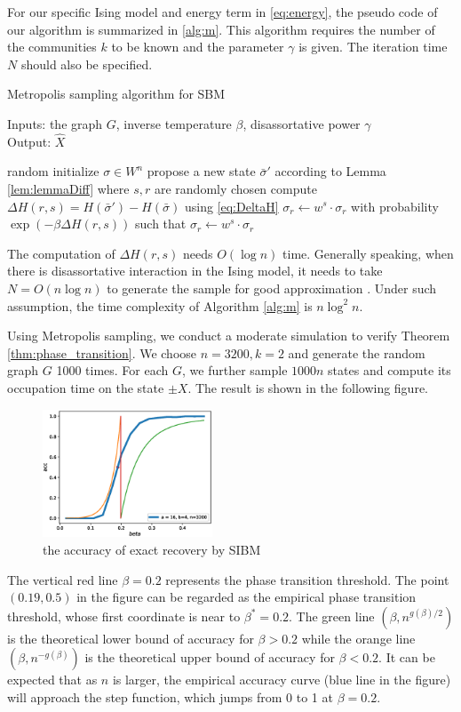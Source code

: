 \documentclass[journal]{IEEEtran}
\newcommand{\1}{\mathbbm{1}}
\begin{document}
For our specific Ising model and energy term in \eqref{eq:energy},
the pseudo code of our algorithm is summarized in \ref{alg:m}.
This algorithm requires the number of the communities $k$ to be known and the parameter $\gamma$ is given.
The iteration time $N$ should also be specified.
\begin{algorithm}[H]
	\caption{Metropolis sampling algorithm for SBM} \label{alg:m}
	Inputs: the graph $G$, inverse temperature $\beta$, disassortative power $\gamma$ \\
	Output: $\hat{X}$
	\begin{algorithmic}[1]
		\STATE random initialize $\sigma \in W^n$
		\STATE propose a new state $\bar{\sigma}'$ according to Lemma \ref{lem:lemmaDiff} where $s, r$ are randomly chosen
		\STATE compute $\Delta H(r,s) = H(\bar{\sigma}') - H(\bar{\sigma})$ using \eqref{eq:DeltaH}
		\STATE $\sigma_r \leftarrow w^s \cdot \sigma_r$
		\ELSE
		\STATE with probability $\exp(-\beta \Delta H(r,s))$
			such that $\sigma_r \leftarrow w^s \cdot \sigma_r$
		\ENDIF
		\ENDFOR
	\end{algorithmic}
\end{algorithm}
The computation of $\Delta H(r,s)$ needs $O(\log n)$ time. Generally speaking, when there is disassortative interaction in
the Ising model, it needs to take $N=O(n\log n)$ to generate the sample for good approximation \cite{mcmc}.
Under such assumption, the time complexity of Algorithm \ref{alg:m} is $n \log^2 n$.

Using Metropolis sampling, we conduct a moderate simulation to verify Theorem \ref{thm:phase_transition}.
We choose $n=3200, k=2$ and generate the random graph $G$ 1000 times. For each $G$, we further sample $1000n$ states and compute its
occupation time on the state $\pm X$. The result is shown in the following figure.
\begin{figure}[!ht]
	\includegraphics[width=0.45\textwidth]{beta_trans-2020-11-13.eps}
	\caption{the accuracy of exact recovery by SIBM}
\end{figure}
The vertical red line $\beta=0.2$ represents the phase transition threshold. The point $(0.19,0.5)$ in the figure
can be regarded as the empirical phase transition threshold, whose first coordinate is near to $\beta^* = 0.2$.
The green line $(\beta, n^{g(\beta)/2})$ is the theoretical lower bound of accuracy for $\beta>0.2$ while the orange line
$(\beta, n^{-g(\beta)})$ is the theoretical upper bound of accuracy for $\beta < 0.2$. It can be expected that
as $n$ is larger, the empirical accuracy curve (blue line in the figure) will approach the step function, which jumps from
0 to 1 at $\beta=0.2$.
\end{document}
